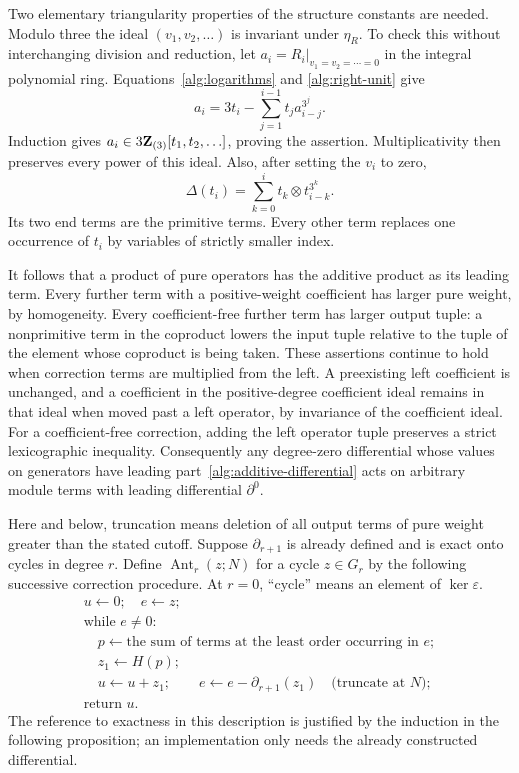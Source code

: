 Two elementary triangularity properties of the structure constants
are needed.  Modulo three the ideal $(v_1,v_2,\ldots)$ is invariant
under $\eta_R$.  To check this without interchanging division and
reduction, let $a_i=R_i|_{v_1=v_2=\cdots=0}$ in the integral
polynomial ring.  Equations~\eqref{alg:logarithms} and
\eqref{alg:right-unit} give
\[
 a_i=3t_i-\sum_{j=1}^{i-1}t_j a_{i-j}^{3^j}.
\]
Induction gives $a_i\in3\mathbf Z_{(3)}[t_1,t_2,\ldots]$, proving the
assertion.  Multiplicativity then preserves every power of this ideal.
Also, after setting the $v_i$ to zero,
\begin{equation}\label{alg:coefficient-free-coproduct}
 \Delta(t_i)=\sum_{k=0}^{i}t_k\otimes t_{i-k}^{3^k}.
\end{equation}
Its two end terms are the primitive terms.  Every other term replaces
one occurrence of $t_i$ by variables of strictly smaller index.

It follows that a product of pure operators has the additive product
as its leading term.  Every further term with a positive-weight coefficient
has larger pure weight, by homogeneity.  Every coefficient-free further
term has larger output tuple: a nonprimitive term in the coproduct
lowers the input tuple relative to the tuple of the element whose
coproduct is being taken.  These assertions continue to hold when
correction terms are multiplied from the left.  A preexisting left
coefficient is unchanged, and a coefficient in the positive-degree
coefficient ideal remains in that ideal when moved past a left operator, by invariance
of the coefficient ideal.  For a coefficient-free correction, adding
the left operator tuple preserves a strict lexicographic inequality.
Consequently any degree-zero differential whose values on generators
have leading part~\eqref{alg:additive-differential} acts on arbitrary
module terms with leading differential $\partial^0$.

Here and below, truncation means deletion of all output terms of pure
weight greater than the stated cutoff.  Suppose $\partial_{r+1}$ is
already defined and is exact onto cycles in degree $r$.  Define
$\operatorname{Ant}_r(z;N)$ for a cycle $z\in G_r$ by the following
successive correction procedure.  At $r=0$, ``cycle'' means an element
of $\ker\varepsilon$.
\begin{equation}\label{alg:antidifferential}
\begin{array}{l}
 u\leftarrow0;\quad e\leftarrow z;\\
 \text{while }e\ne0:\\
 \quad p\leftarrow\text{the sum of terms at the least order occurring in }e;\\
 \quad z_1\leftarrow H(p);\\
 \quad u\leftarrow u+z_1;\qquad
 e\leftarrow e-\partial_{r+1}(z_1)\quad\text{(truncate at }N\text{)};\\
 \text{return }u.
\end{array}
\end{equation}
The reference to exactness in this description is justified by the
induction in the following proposition; an implementation only needs
the already constructed differential.

